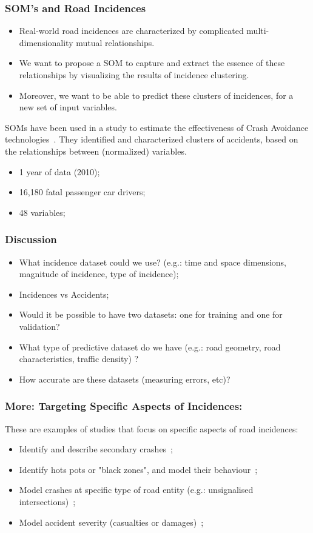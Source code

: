 \documentclass[hyperref={pdfpagelabels=true}]{beamer}
\begin{document}
\begin{frame}
\frametitle{SOM's and Road Incidences}
\begin{itemize}
\item Real-world road incidences are characterized by complicated multi-dimensionality mutual relationships.
\item We want to propose a SOM to capture and extract the essence of these relationships by visualizing the results of incidence clustering.
\item Moreover, we want to be able to predict these clusters of incidences, for a new set of input variables.
\end{itemize}
SOMs have been used in a study to estimate the effectiveness of Crash Avoidance technologies~\cite{crash}. They identified and characterized clusters of accidents, based on the relationships between (normalized) variables.
\begin{itemize}
\item <2-> 1 year of data (2010);
\item <3-> 16,180 fatal passenger car drivers;
\item <4-> 48 variables;
\end{itemize}
\end{frame}

\begin{frame}
\frametitle{Discussion}
\begin{itemize}
\item What incidence dataset could we use? (e.g.: time and space dimensions, magnitude of incidence, type of incidence);
\item Incidences vs Accidents;
\item Would it be possible to have two datasets: one for training and one for validation?
\item What type of predictive dataset do we have (e.g.: road geometry, road characteristics, traffic density) ?
\item How accurate are these datasets (measuring errors, etc)?
\end{itemize}
\end{frame}

\begin{frame}
\frametitle{More: Targeting Specific Aspects of Incidences:}
These are examples of studies that focus on specific aspects of road incidences:
\begin{itemize}
\item Identify and describe secondary crashes~\cite{secondary};%
\item Identify hots pots or "black zones", and model their behaviour~\cite{bayesian};
\item Model crashes at specific type of road entity (e.g.: unsignalised intersections)~\cite{mars};%
\item Model accident severity (casualties or damages)~\cite{severity};%
\end{itemize}
\end{frame}
\end{document}
